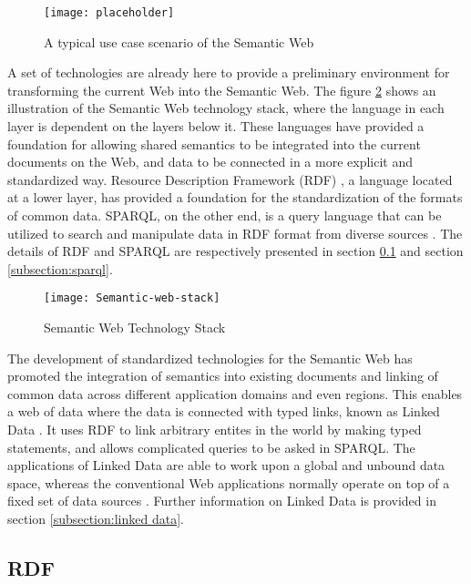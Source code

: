 \begin{figure}[h]
\centering
\texttt{[image: placeholder]}
\caption{A typical use case scenario of the Semantic Web}
\label{figure:usecase1}
\end{figure}

A set of technologies are already here to provide a preliminary environment for transforming the current Web into the Semantic Web. The figure \ref{figure:semantic web stack} shows an illustration of the Semantic Web technology stack, where the language in each layer is dependent on the layers below it. These languages have provided a foundation for allowing shared semantics to be integrated into the current documents on the Web, and data to be connected in a more explicit and standardized way. Resource Description Framework (RDF) \cite{Cyganiak2014}, a language located at a lower layer, has provided a foundation for the standardization of the formats of common data. SPARQL, on the other end, is a query language that can be utilized to search and manipulate data in RDF format from diverse sources \cite{Harris2013}. The details of RDF and SPARQL are respectively presented in section \ref{subsection:rdf} and section \ref{subsection:sparql}.

\begin{figure}[h]
\texttt{[image: Semantic-web-stack]}
\centering
\caption{Semantic Web Technology Stack}
\label{figure:semantic web stack}
\end{figure}

The development of standardized technologies for the Semantic Web has promoted the integration of semantics into existing documents and linking of common data across different application domains and even regions. This enables a web of data where the data is connected with typed links, known as Linked Data \cite{Bizer2009}. It uses RDF to link arbitrary entites in the world by making typed statements, and allows complicated queries to be asked in SPARQL. The applications of Linked Data are able to work upon a global and unbound data space, whereas the conventional Web applications normally operate on top of a fixed set of data sources \cite{Bizer2009}. Further information on Linked Data is provided in section \ref{subsection:linked data}.

\subsection{RDF} \label{subsection:rdf}

